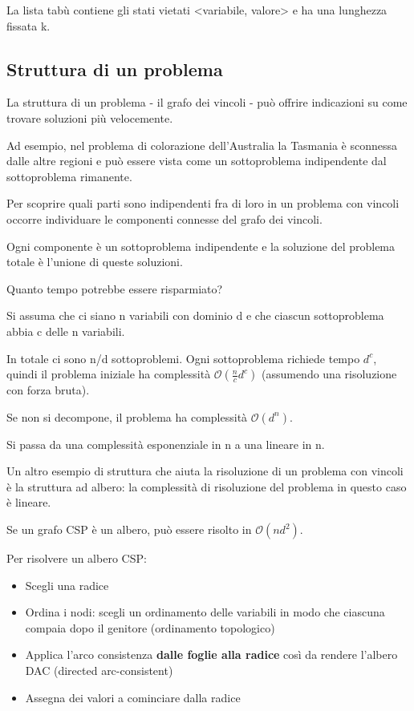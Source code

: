 La lista tabù contiene gli stati vietati <variabile, valore> e ha una lunghezza
fissata k.

\subsection{Struttura di un problema}

La struttura di un problema - il grafo dei vincoli - può offrire indicazioni su
come trovare soluzioni più velocemente.

Ad esempio, nel problema di colorazione dell'Australia la Tasmania è sconnessa
dalle altre regioni e può essere vista come un sottoproblema indipendente dal
sottoproblema rimanente.

Per scoprire quali parti sono indipendenti fra di loro in un problema con
vincoli occorre individuare le componenti connesse del grafo dei vincoli.

Ogni componente è un sottoproblema indipendente e la soluzione del problema
totale è l'unione di queste soluzioni.

Quanto tempo potrebbe essere risparmiato?

Si assuma che ci siano n variabili con dominio d e che ciascun sottoproblema
abbia c delle n variabili.

In totale ci sono n/d sottoproblemi. Ogni sottoproblema richiede tempo $d^c$,
quindi il problema iniziale ha complessità $\mathcal{O}(\frac{n}{c} d^c)$
(assumendo una risoluzione con forza bruta).

Se non si decompone, il problema ha complessità $\mathcal{O}(d^n)$.

Si passa da una complessità esponenziale in n a una lineare in n.

Un altro esempio di struttura che aiuta la risoluzione di un problema con
vincoli è la struttura ad albero: la complessità di risoluzione del problema
in questo caso è lineare.

Se un grafo CSP è un albero, può essere risolto in $\mathcal{O}(nd^2)$.

Per risolvere un albero CSP:

\begin{itemize}
 \item Scegli una radice
 \item Ordina i nodi: scegli un ordinamento delle variabili in modo che
ciascuna compaia dopo il genitore (ordinamento topologico)
 \item Applica l'arco consistenza \textbf{dalle foglie alla radice}
così da rendere l'albero DAC (directed arc-consistent)
 \item Assegna dei valori a cominciare dalla radice
\end{itemize}


